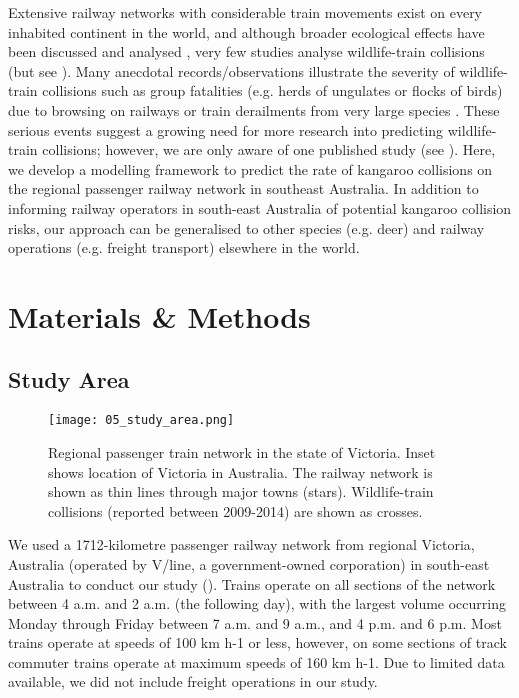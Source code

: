 Extensive railway networks with considerable train movements exist on every inhabited continent in the world, and although broader ecological effects have been discussed \citep{desa93,givo06} and analysed \citep{wall05}, very few studies analyse wildlife-train collisions (but see \cite{bela95,onoy98}). Many anecdotal records/observations illustrate the severity of wildlife-train collisions such as group fatalities (e.g. herds of ungulates or flocks of birds) due to browsing on railways or train derailments from very large species \citep{dors15}. These serious events suggest a growing need for more research into predicting wildlife-train collisions; however, we are only aware of one published study (see \cite{gund98}). Here, we develop a modelling framework to predict the rate of kangaroo collisions on the regional passenger railway network in southeast Australia. In addition to informing railway operators in south-east Australia of potential kangaroo collision risks, our approach can be generalised to other species (e.g. deer) and railway operations (e.g. freight transport) elsewhere in the world.

\section{Materials \& Methods}

\subsection{Study Area}

\begin{figure*}[htp]
  \centering
  \texttt{[image: 05\_study\_area.png]}
  \caption[Regional passenger train network in Victoria]{Regional passenger train network in the state of Victoria. Inset shows location of Victoria in Australia. The railway network is shown as thin lines through major towns (stars). Wildlife-train collisions (reported between 2009-2014) are shown as crosses.}
  \label{trains_study_area}
\end{figure*}

We used a 1712-kilometre passenger railway network from regional Victoria, Australia (operated by V/line, a government-owned corporation) in south-east Australia to conduct our study ().  Trains operate on all sections of the network between 4 a.m. and 2 a.m. (the following day), with the largest volume occurring Monday through Friday between 7 a.m. and 9 a.m., and 4 p.m. and 6 p.m. Most trains operate at speeds of 100 km h-1 or less, however, on some sections of track commuter trains operate at maximum speeds of 160 km h-1. Due to limited data available, we did not include freight operations in our study.

